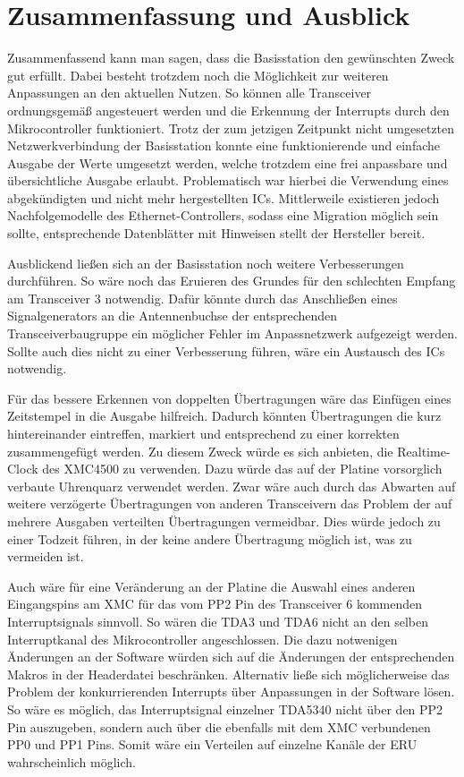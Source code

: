 \chapter{Zusammenfassung und Ausblick}
\label{sec:Zusammenfassung}
\pagestyle{scrheadings}
Zusammenfassend kann man sagen, dass die Basisstation den gewünschten Zweck gut erfüllt. Dabei besteht trotzdem noch die Möglichkeit zur weiteren Anpassungen an den aktuellen Nutzen. So können alle Transceiver ordnungsgemäß angesteuert werden und die Erkennung der Interrupts durch den Mikrocontroller funktioniert. Trotz der zum jetzigen Zeitpunkt nicht umgesetzten Netzwerkverbindung der Basisstation konnte eine funktionierende und einfache Ausgabe der Werte umgesetzt werden, welche trotzdem eine frei anpassbare und übersichtliche Ausgabe erlaubt. Problematisch war hierbei die Verwendung eines abgekündigten und nicht mehr hergestellten \acp{IC}. Mittlerweile existieren jedoch Nachfolgemodelle des Ethernet-Controllers, sodass eine Migration möglich sein sollte, entsprechende Datenblätter mit Hinweisen stellt der Hersteller bereit. 





Ausblickend ließen sich an der Basisstation noch weitere Verbesserungen durchführen.
So wäre noch das Eruieren des Grundes für den schlechten Empfang am Transceiver $3$ notwendig. Dafür könnte durch das Anschließen eines Signalgenerators an die Antennenbuchse der entsprechenden Transceiverbaugruppe ein möglicher Fehler im Anpassnetzwerk aufgezeigt werden. Sollte auch dies nicht zu einer Verbesserung führen, wäre ein Austausch des \acp{IC} notwendig.

Für das bessere Erkennen von doppelten Übertragungen wäre das Einfügen eines Zeitstempel in die Ausgabe hilfreich. Dadurch könnten Übertragungen die kurz hintereinander eintreffen, markiert und entsprechend zu einer korrekten zusammengefügt werden. Zu diesem Zweck würde es sich anbieten, die Realtime-Clock des XMC4500 zu verwenden. Dazu würde das auf der Platine vorsorglich verbaute Uhrenquarz verwendet werden. Zwar wäre auch durch das Abwarten auf weitere verzögerte Übertragungen von anderen Transceivern das Problem der auf mehrere Ausgaben verteilten Übertragungen vermeidbar. Dies würde jedoch zu einer Todzeit führen, in der keine andere Übertragung möglich ist, was zu vermeiden ist.

Auch wäre für eine Veränderung an der Platine die Auswahl eines anderen Eingangspins am XMC für das vom PP2 Pin des Transceiver 6 kommenden Interruptsignals sinnvoll. So wären die TDA3 und TDA6 nicht an den selben Interruptkanal des Mikrocontroller angeschlossen. Die dazu notwenigen Änderungen an der Software würden sich auf die Änderungen der entsprechenden Makros in der Headerdatei beschränken.
Alternativ ließe sich möglicherweise das Problem der konkurrierenden Interrupts über Anpassungen in der Software lösen. So wäre es möglich, das Interruptsignal einzelner TDA5340 nicht über den PP2 Pin auszugeben, sondern auch über die ebenfalls mit dem XMC verbundenen PP0 und PP1 Pins. Somit wäre ein Verteilen auf einzelne Kanäle der \ac{ERU} wahrscheinlich möglich.


